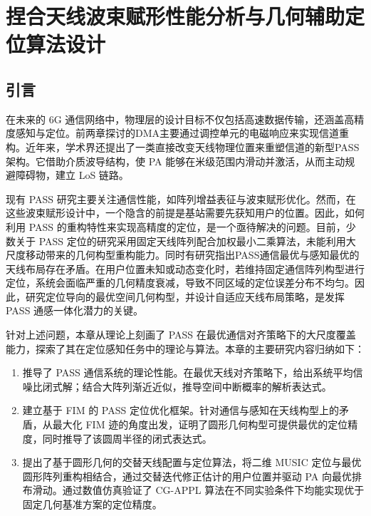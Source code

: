 \chapter{捏合天线波束赋形性能分析与几何辅助定位算法设计}\label{ch:pass}

\section{引言}\label{sec:pass_intro}

在未来的 6G 通信网络中，物理层的设计目标不仅包括高速数据传输，还涵盖高精度感知与定位。前两章探讨的DMA主要通过调控单元的电磁响应来实现信道重构。近年来，学术界还提出了一类直接改变天线物理位置来重塑信道的新型PASS架构。它借助介质波导结构，使 PA 能够在米级范围内滑动并激活，从而主动规避障碍物，建立 LoS 链路。

现有 PASS 研究主要关注通信性能，如阵列增益表征\cite{ouyang2025array}与波束赋形优化\cite{wang2025modeling}。然而，在这些波束赋形设计中，一个隐含的前提是基站需要先获知用户的位置。因此，如何利用 PASS 的重构特性来实现高精度的定位，是一个亟待解决的问题。目前，少数关于 PASS 定位的研究采用固定天线阵列配合加权最小二乘算法，未能利用大尺度移动带来的几何构型重构能力\cite{zhang2025pinchingantenna}。同时有研究指出PASS通信最优与感知最优的天线布局存在矛盾\cite{jiang2025pinching}。在用户位置未知或动态变化时，若维持固定通信阵列构型进行定位，系统会面临严重的几何精度衰减，导致不同区域的定位误差分布不均匀。因此，研究定位导向的最优空间几何构型，并设计自适应天线布局策略，是发挥 PASS 通感一体化潜力的关键。

针对上述问题，本章从理论上刻画了 PASS 在最优通信对齐策略下的大尺度覆盖能力，探索了其在定位感知任务中的理论与算法。本章的主要研究内容归纳如下：

\begin{enumerate}
	\item 推导了 PASS 通信系统的理论性能。在最优天线对齐策略下，给出系统平均信噪比闭式解；结合大阵列渐近近似，推导空间中断概率的解析表达式。
	
	\item 建立基于 FIM 的 PASS 定位优化框架。针对通信与感知在天线构型上的矛盾，从最大化 FIM 迹的角度出发，证明了圆形几何构型可提供最优的定位精度，同时推导了该圆周半径的闭式表达式。
	
	\item 提出了基于圆形几何的交替天线配置与定位算法，将二维 MUSIC 定位与最优圆形阵列重构相结合，通过交替迭代修正估计的用户位置并驱动 PA 向最优排布滑动。通过数值仿真验证了 CG-APPL 算法在不同实验条件下均能实现优于固定几何基准方案的定位精度。
\end{enumerate}

